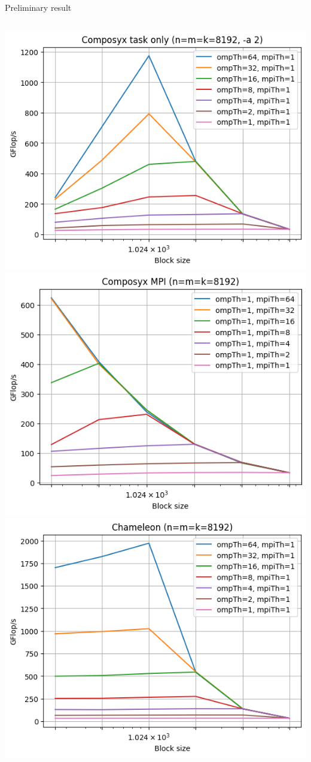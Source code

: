 \documentclass[tikz,presentation,border=10pt]{beamer}
\begin{document}
\begin{frame}{Preliminary result}
    \begin{columns}
        \includegraphics[width=\textwidth]{images/composyx_task.png}
        \includegraphics[width=\textwidth]{images/composyx_MPI.png}
        \includegraphics[width=\textwidth]{images/chameleon_bench.png}

\end{columns}
\end{frame}
\end{document}
